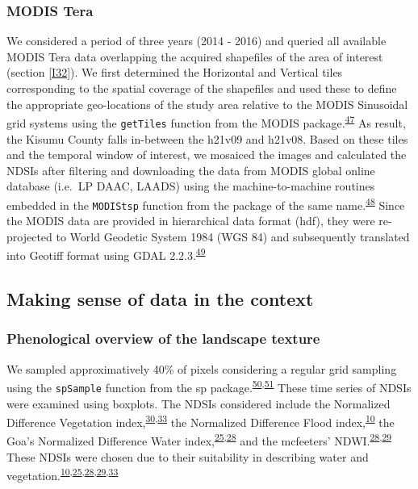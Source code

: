 \documentclass[12pt,oneside]{article}
\begin{document}
\hypertarget{I33}{%
\subsubsection{MODIS Tera}\label{I33}}

We considered a period of three years (2014 - 2016) and queried all available MODIS Tera data overlapping the acquired shapefiles of the area of interest (section \ref{I32}). We first determined the Horizontal and Vertical tiles corresponding to the spatial coverage of the shapefiles and used these to define the appropriate geo-locations of the study area relative to the MODIS Sinusoidal grid systems using the \texttt{getTiles} function from the MODIS package.\textsuperscript{\protect\hyperlink{ref-Mattiuzzi_and_Detsch_2018}{47}} As result, the Kisumu County falls in-between the h21v09 and h21v08. Based on these tiles and the temporal window of interest, we mosaiced the images and calculated the NDSIs after filtering and downloading the data from MODIS global online database (i.e.~LP DAAC, LAADS) using the machine-to-machine routines embedded in the \texttt{MODIStsp} function from the package of the same name.\textsuperscript{\protect\hyperlink{ref-Busetto_and_ranghetti_2016}{48}} Since the MODIS data are provided in hierarchical data format (hdf), they were re-projected to World Geodetic System 1984 (WGS 84) and subsequently translated into Geotiff format using GDAL 2.2.3.\textsuperscript{\protect\hyperlink{ref-GDAL_OGRcontributors_2018}{49}}

\hypertarget{I4}{%
\subsection{Making sense of data in the context}\label{I4}}

\hypertarget{I41}{%
\subsubsection{Phenological overview of the landscape texture}\label{I41}}

We sampled approximatively 40\% of pixels considering a regular grid sampling using the \texttt{spSample} function from the sp package.\textsuperscript{\protect\hyperlink{ref-Bivand_et_al_2013}{50},\protect\hyperlink{ref-Pebesma_Bivand_2005}{51}} These time series of NDSIs were examined using boxplots. The NDSIs considered include the Normalized Difference Vegetation index,\textsuperscript{\protect\hyperlink{ref-Rouse_et_al_1973}{30},\protect\hyperlink{ref-Tucker_1979}{33}} the Normalized Difference Flood index,\textsuperscript{\protect\hyperlink{ref-Boschetti_et_al_2014}{10}} the Goa's Normalized Difference Water index,\textsuperscript{\protect\hyperlink{ref-Gao_1996}{25},\protect\hyperlink{ref-Ji_et_al_2009}{28}} and the mcfeeters' NDWI.\textsuperscript{\protect\hyperlink{ref-Ji_et_al_2009}{28},\protect\hyperlink{ref-McFeeters_1996}{29}} These NDSIs were chosen due to their suitability in describing water and vegetation.\textsuperscript{\protect\hyperlink{ref-Boschetti_et_al_2014}{10},\protect\hyperlink{ref-Gao_1996}{25},\protect\hyperlink{ref-Ji_et_al_2009}{28},\protect\hyperlink{ref-McFeeters_1996}{29},\protect\hyperlink{ref-Tucker_1979}{33}}
\end{document}
